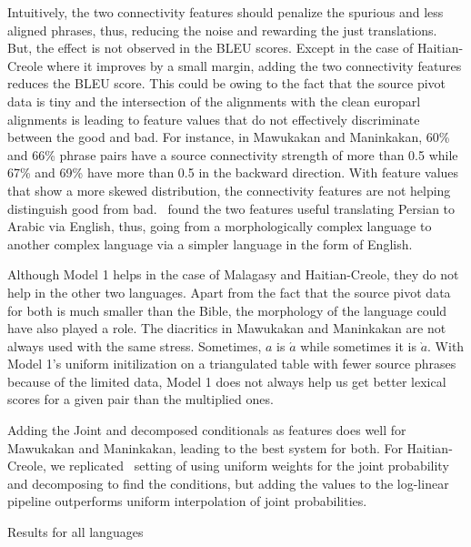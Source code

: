 Intuitively, the two connectivity features should penalize the spurious and less aligned phrases, thus, reducing the noise and rewarding the just translations. But, the effect is not observed in the BLEU scores. Except in the case of Haitian-Creole where it improves by a small margin, adding the two connectivity features reduces the BLEU score. This could be owing to the fact that the source pivot data is tiny and the intersection of the alignments with the clean europarl alignments is leading to feature values that do not effectively discriminate between the good and bad. For instance, in Mawukakan and Maninkakan, 60\% and 66\% phrase pairs have a source connectivity strength of more than 0.5 while 67\% and 69\% have more than 0.5 in the backward direction. With feature values that show a more skewed distribution, the connectivity features are not helping distinguish good from bad.~\cite{Ahmed:13} found the two features useful translating Persian to Arabic via English, thus, going from a morphologically complex language to another complex language via a simpler language in the form of English.

Although Model 1 helps in the case of Malagasy and Haitian-Creole, they do not help in the other two languages. Apart from the fact that the source pivot data for both is much smaller than the Bible, the morphology of the language could have also played a role. The diacritics in Mawukakan and Maninkakan are not always used with the same stress. Sometimes, $a$ is $\acute{a}$ while sometimes it is $\grave{a}$. With Model 1's uniform initilization on a triangulated table with fewer source phrases because of the limited data, Model 1 does not always help us get better lexical scores for a given pair than the multiplied ones.

Adding the Joint and decomposed conditionals as features does well for Mawukakan and Maninkakan, leading to the best system for both. For Haitian-Creole, we replicated~\cite{Cohn:07} setting of using uniform weights for the joint probability and decomposing to find the conditions, but adding the values to the log-linear pipeline outperforms uniform interpolation of joint probabilities.


\begin{table}
	\small
	\centering
	
	\caption{Results for all languages}
	\label{table:all_results}
\end{table}



